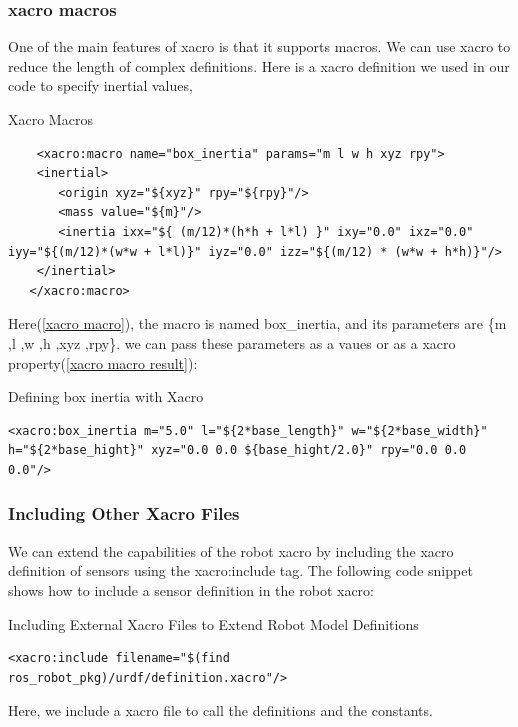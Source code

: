 \documentclass[../../main]{subfiles}
\begin{document}
\subsubsection{xacro macros}
One of the main features of xacro is that it supports macros. We can use xacro to reduce
the length of complex definitions. Here is a xacro definition we used in our code to
specify inertial values,
\begin{codebox}[label=xacro macro]{Xacro Macros}
  \begin{verbatim}
    <xacro:macro name="box_inertia" params="m l w h xyz rpy">
    <inertial>
       <origin xyz="${xyz}" rpy="${rpy}"/>
       <mass value="${m}"/>
       <inertia ixx="${ (m/12)*(h*h + l*l) }" ixy="0.0" ixz="0.0" iyy="${(m/12)*(w*w + l*l)}" iyz="0.0" izz="${(m/12) * (w*w + h*h)}"/>
    </inertial>
   </xacro:macro>
\end{verbatim}
\end{codebox}
Here(\cref{xacro macro}), the macro is named box\_inertia, and its parameters are \{m ,l ,w ,h ,xyz ,rpy\}. we can pass these parameters as a vaues or as a xacro property(\cref{xacro macro result}):
\begin{codebox}[label=xacro macro result]{Defining box inertia with Xacro}
  \begin{verbatim}
<xacro:box_inertia m="5.0" l="${2*base_length}" w="${2*base_width}" h="${2*base_hight}" xyz="0.0 0.0 ${base_hight/2.0}" rpy="0.0 0.0 0.0"/>
\end{verbatim}
  \end{codebox}

\subsubsection{Including Other Xacro Files}
We can extend the capabilities of the robot xacro by including the xacro definition of
sensors using the xacro:include tag. The following code snippet shows how to include
a sensor definition in the robot xacro:
\begin{codebox}[]{Including External Xacro Files to Extend Robot Model Definitions}
  \begin{verbatim}
<xacro:include filename="$(find ros_robot_pkg)/urdf/definition.xacro"/>
\end{verbatim}
  \end{codebox}
Here, we include a xacro file to call the definitions and the constants. 
\newpage
\end{document}
